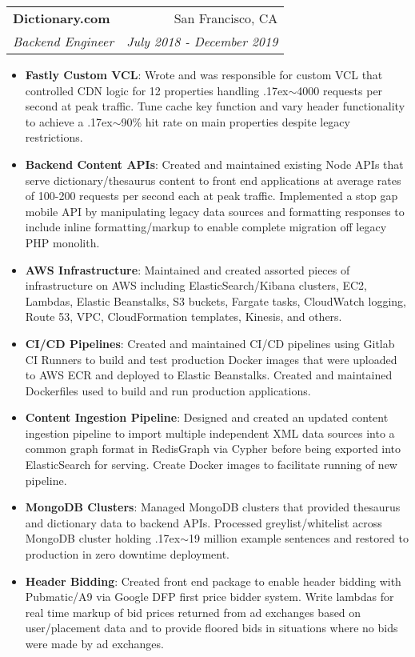 \documentclass[letterpaper,11pt]{article}
\makeatletter
\newcommand{\resumeItem}[2]{
  \item\small{
    \textbf{#1}{: #2 \vspace{-2pt}}
  }
}
\newcommand{\resumeSubheading}[4]{
  \vspace{-1pt}\item
    \begin{tabular*}{0.97\textwidth}[t]{l@{\extracolsep{\fill}}r}
      \textbf{#1} & #2 \\
      \textit{\small#3} & \textit{\small #4} \\
    \end{tabular*}\vspace{-5pt}
}
\newcommand{\resumeItemListStart}{\begin{itemize}}
\newcommand{\resumeItemListEnd}{\end{itemize}\vspace{-5pt}}
\makeatother
\begin{document}
    \resumeSubheading
      {Dictionary.com}{San Francisco, CA}
      {Backend Engineer}{July 2018 - December 2019}
      \resumeItemListStart
        \resumeItem{Fastly Custom VCL}
          {Wrote and was responsible for custom VCL that controlled CDN logic for 12 properties handling {\raise.17ex\hbox{$\scriptstyle\sim$}}4000 requests per second at peak traffic. Tune cache key function and vary header functionality to achieve a {\raise.17ex\hbox{$\scriptstyle\sim$}}90\% hit rate on main properties despite legacy restrictions.}
        \resumeItem{Backend Content APIs}
          {Created and maintained existing Node APIs that serve dictionary/thesaurus content to front end applications at average rates of 100-200 requests per second each at peak traffic. Implemented a stop gap mobile API by manipulating legacy data sources and formatting responses to include inline formatting/markup to enable complete migration off legacy PHP monolith.}
         \resumeItem{AWS Infrastructure}
          {Maintained and created assorted pieces of infrastructure on AWS including ElasticSearch/Kibana clusters, EC2, Lambdas, Elastic Beanstalks, S3 buckets, Fargate tasks, CloudWatch logging, Route 53, VPC, CloudFormation templates, Kinesis, and others. }
         \resumeItem{CI/CD Pipelines}
          {Created and maintained CI/CD pipelines using Gitlab CI Runners to build and test production Docker images that were uploaded to AWS ECR and deployed to Elastic Beanstalks. Created and maintained Dockerfiles used to build and run production applications.}
         \resumeItem{Content Ingestion Pipeline}
          {Designed and created an updated content ingestion pipeline to import multiple independent XML data sources into a common graph format in RedisGraph via Cypher before being exported into ElasticSearch for serving. Create Docker images to facilitate running of new pipeline.}
         \resumeItem{MongoDB Clusters}
          {Managed MongoDB clusters that provided thesaurus and dictionary data to backend APIs. Processed greylist/whitelist across MongoDB cluster holding {\raise.17ex\hbox{$\scriptstyle\sim$}}19 million example sentences and restored to production in zero downtime deployment. }
         \resumeItem{Header Bidding}
          {Created front end package to enable header bidding with Pubmatic/A9 via Google DFP first price bidder system. Write lambdas for real time markup of bid prices returned from ad exchanges based on user/placement data and to provide floored bids in situations where no bids were made by ad exchanges.   }
      \resumeItemListEnd
\end{document}
